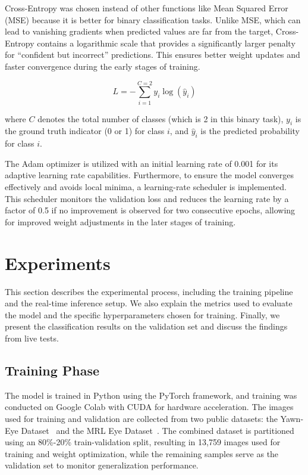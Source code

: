 \documentclass[10pt,twocolumn,letterpaper]{article}
\begin{document}
Cross-Entropy was chosen instead of other functions like Mean Squared Error (MSE) because it is better for binary classification tasks. 
Unlike MSE, which can lead to vanishing gradients when predicted values are far from the target, 
Cross-Entropy contains a logarithmic scale that provides a significantly larger penalty for ``confident but incorrect'' predictions. 
This ensures better weight updates and faster convergence during the early stages of training.

\begin{equation}
L = -\sum_{i=1}^{C=2} y_i \log(\hat{y}_i)
\end{equation}

where $C$ denotes the total number of classes (which is 2 in this binary task), $y_i$ is the ground truth indicator (0 or 1) for class $i$, and $\hat{y}_i$ is the predicted probability for class $i$. 

The Adam optimizer is utilized with an initial learning rate of 0.001 for its adaptive learning rate capabilities. Furthermore, to ensure the model converges effectively and avoids local minima, a learning-rate scheduler is implemented. 
This scheduler monitors the validation loss and reduces the learning rate by a factor of 0.5 if no improvement is observed for two consecutive epochs, allowing for improved weight adjustments in the later stages of training.

\section{Experiments}
This section describes the experimental process, including the training pipeline and the real-time inference setup. We also explain the metrics used to evaluate the model and the specific hyperparameters chosen for training. Finally, we present the classification results on the validation set and discuss the findings from live tests.

\subsection{Training Phase}

The model is trained in Python using the PyTorch framework, and training was conducted on Google Colab with CUDA for hardware acceleration. The images used for training and validation are collected from two public datasets: the Yawn-Eye Dataset~\cite{raju_2020} and the MRL Eye Dataset~\cite{shingha_2023}. 
The combined dataset is partitioned using an 80\%-20\% train-validation split, resulting in 13,759 images used for training and weight optimization, while the remaining samples serve as the validation set to monitor generalization performance.
\end{document}
